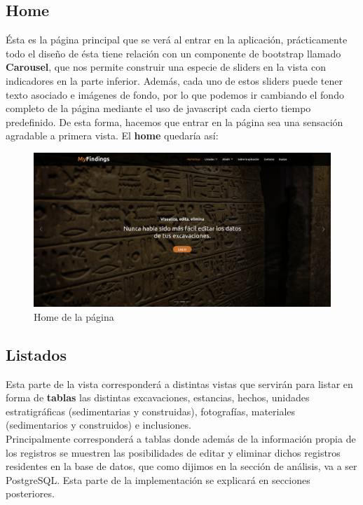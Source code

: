     \subsection{Home}
    Ésta es la página principal que se verá al entrar en la aplicación, prácticamente todo el
    diseño de ésta tiene relación con un componente de bootstrap llamado \textbf{Carousel}, que
    nos permite construir una especie de sliders en la vista con indicadores en la parte
    inferior. Además, cada uno de estos sliders puede tener texto asociado e imágenes de fondo,
    por lo que podemos ir cambiando el fondo completo de la página mediante el uso de javascript
    cada cierto tiempo predefinido. De esta forma, hacemos que entrar en la página sea una
    sensación agradable a primera vista. El \textbf{home} quedaría así:
    
        \begin{figure}[H]
            \centering
            \includegraphics[scale=0.17]{imagenes/home.png}
            \caption{Home de la página}
            \label{fig:home}
        \end{figure}

    \subsection{Listados}
    Esta parte de la vista corresponderá a distintas vistas que servirán para listar en forma
    de \textbf{tablas} las distintas excavaciones, estancias, hechos, unidades estratigráficas
    (sedimentarias y construidas), fotografías, materiales (sedimentarios y construidos) e
    inclusiones.\\

    Principalmente corresponderá a tablas donde además de la información propia
    de los registros se muestren las posibilidades de editar y eliminar dichos registros
    residentes en la base de datos, que como dijimos en la sección de análisis, va a ser
    PostgreSQL. Esta parte de la implementación se explicará en secciones posteriores.

